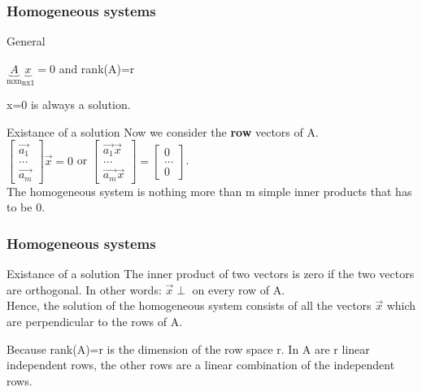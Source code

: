 \begin{frame}
	\frametitle{Homogeneous systems}
	\begin{block}{General}
		\begin{center}
			$\underbrace{A}_\text{mxn}\underbrace{x}_\text{nx1}=0$ and rank(A)=r
		\end{center}
		\begin{center}
			 x=0 is always a solution.
		\end{center}
	\end{block}
	\begin{block}{Existance of a solution}
		Now we consider the \textbf{row} vectors of A.\\
		$\begin{bmatrix}
		\overrightarrow{a_1}\\...\\\overrightarrow{a_m}
		\end{bmatrix}\overrightarrow{x}=0$ or $\begin{bmatrix}
		\overrightarrow{a_1}\overrightarrow{x}\\...\\\overrightarrow{a_m}\overrightarrow{x}
		\end{bmatrix}=\begin{bmatrix}
		0\\...\\0
		\end{bmatrix}$.\\
		The homogeneous system is nothing more than m simple inner products that has to be 0. 
	\end{block}
\end{frame}

\begin{frame}
	\frametitle{Homogeneous systems}
	\begin{block}{Existance of a solution}
		The inner product of two vectors is zero if the two vectors are orthogonal. In other words: $\overrightarrow{x} \perp $ on every row of A. \\
		Hence, the solution of the homogeneous system consists of all the vectors $\overrightarrow{x}$ which are perpendicular to the rows of A. \vspace{4mm}
		
		Because rank(A)=r is the dimension of the row space r. In A are r linear independent rows, the other rows are a linear combination of the independent rows.
	\end{block}
\end{frame}

